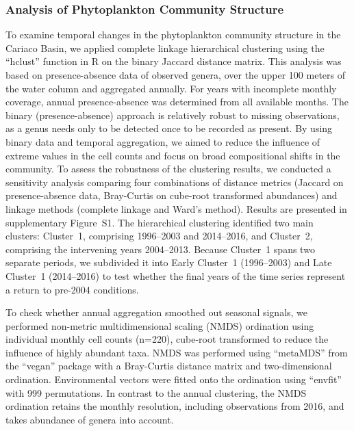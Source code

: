 \documentclass[]{agujournal2019}
\begin{document}
    \subsubsection{Analysis of Phytoplankton Community Structure}
        To examine temporal changes in the phytoplankton community structure in the Cariaco Basin, we applied complete linkage hierarchical clustering using the ``hclust'' function in R \cite{r_core_team_r_2024} on the binary Jaccard distance matrix. 
        This analysis was based on presence-absence data of observed genera, over the upper 100 meters of the water column and aggregated annually. For years with incomplete monthly coverage, annual presence-absence was determined from all available months. The binary (presence-absence) approach is relatively robust to missing observations, as a genus needs only to be detected once to be recorded as present. By using binary data and temporal aggregation, we aimed to reduce the influence of extreme values in the cell counts and focus on broad compositional shifts in the community. To assess the robustness of the clustering results, we conducted a sensitivity analysis comparing four combinations of distance metrics (Jaccard on presence-absence data, Bray-Curtis on cube-root transformed abundances) and linkage methods (complete linkage and Ward's method). Results are presented in supplementary Figure~S1.
        The hierarchical clustering identified two main clusters: Cluster~1, comprising 1996–2003 and 2014–2016, and Cluster~2, comprising the intervening years 2004–2013. Because Cluster~1 spans two separate periods, we subdivided it into Early Cluster~1 (1996–2003) and Late Cluster~1 (2014–2016) to test whether the final years of the time series represent a return to pre-2004 conditions.

        To check whether annual aggregation smoothed out seasonal signals, we performed non-metric multidimensional scaling (NMDS) ordination using individual monthly cell counts (n=220), cube-root transformed to reduce the influence of highly abundant taxa. NMDS was performed using ``metaMDS'' from the ``vegan'' package \cite{oksanen_vegan_2024} with a Bray-Curtis distance matrix and two-dimensional ordination. Environmental vectors were fitted onto the ordination using ``envfit'' with 999 permutations. In contrast to the annual clustering, the NMDS ordination retains the monthly resolution, including observations from 2016, and takes abundance of genera into account.
\end{document}
